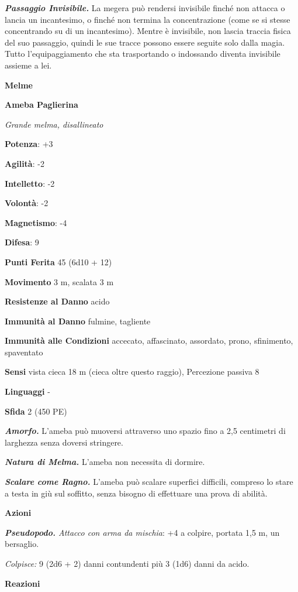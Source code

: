 \begin{multicols}{2}
\emph{\textbf{Passaggio Invisibile.}} La megera può rendersi invisibile
finché non attacca o lancia un incantesimo, o finché non termina la
concentrazione (come se si stesse concentrando su di un incantesimo).
Mentre è invisibile, non lascia traccia fisica del suo passaggio, quindi
le sue tracce possono essere seguite solo dalla magia. Tutto
l'equipaggiamento che sta trasportando o indossando diventa invisibile
assieme a lei.

\textbf{Melme}

\textbf{Ameba Paglierina}

\emph{Grande melma, disallineato}

\textbf{Potenza}: +3

\textbf{Agilità}: -2

\textbf{Intelletto}: -2

\textbf{Volontà}: -2

\textbf{Magnetismo}: -4

\textbf{Difesa}: 9

\textbf{Punti Ferita} 45 (6d10 + 12)

\textbf{Movimento} 3 m, scalata 3 m

\textbf{Resistenze al Danno} acido

\textbf{Immunità al Danno} fulmine, tagliente

\textbf{Immunità alle Condizioni} accecato, affascinato, assordato,
prono, sfinimento, spaventato

\textbf{Sensi} vista cieca 18 m (cieca oltre questo raggio), Percezione
passiva 8

\textbf{Linguaggi} -

\textbf{Sfida} 2 (450 PE)

\emph{\textbf{Amorfo.}} L'ameba può muoversi attraverso uno spazio fino
a 2,5 centimetri di larghezza senza doversi stringere.

\emph{\textbf{Natura di Melma.}} L'ameba non necessita di dormire.

\emph{\textbf{Scalare come Ragno.}} L'ameba può scalare superfici
difficili, compreso lo stare a testa in giù sul soffitto, senza bisogno
di effettuare una prova di abilità.

\textbf{Azioni}

\emph{\textbf{Pseudopodo.} Attacco con arma da mischia}: +4 a colpire,
portata 1,5 m, un bersaglio.

\emph{Colpisce:} 9 (2d6 + 2) danni contundenti più 3 (1d6) danni da
acido.

\textbf{Reazioni}


\end{multicols}
